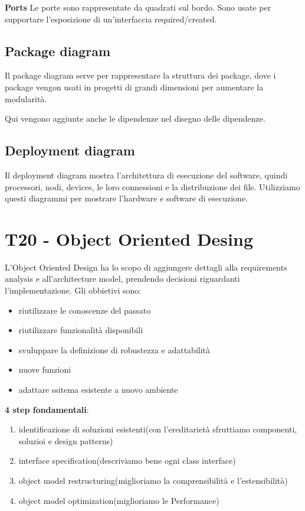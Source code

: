 \documentclass{article}
\begin{document}
\textbf{Ports} Le porte sono rappresentate da quadrati sul bordo. Sono usate per supportare l’esposizione di
un'interfaccia required/created.


\subsection{Package diagram}


Il package diagram serve per rappresentare la struttura dei package, dove i package 
vengon usati in progetti di grandi dimensioni per aumentare la modularità.

Qui vengono aggiunte anche le dipendenze nel disegno delle dipendenze.

\subsection{Deployment diagram}
Il deployment diagram mostra l'architettura di esecuzione del software, quindi processori, nodi, devices,
le loro connessioni e la distribuzione dei file. Utilizziamo questi diagrammi per mostrare l’hardware e
software di esecuzione.

\section{T20 - Object Oriented Desing}
L'Object Oriented Design ha lo scopo di aggiungere dettagli alla requirements analysis e all’architecture
model, prendendo decisioni riguardanti l'implementazione.
Gli obbietivi sono:
\begin{itemize}
    \item riutilizzare le conoscenze del passato
    \item riutilizzare funzionalità disponibili
    \item svuluppare la definizione di robustezza e adattabilità
    \item nuove funzioni
    \item adattare ssitema esistente a nuovo ambiente
\end{itemize}

\textbf{4 step fondamentali}:
\begin{enumerate}
    \item identificazione di soluzioni esistenti(con l'ereditarietà sfruttiamo componenti, soluzioi e design patterns) 
    \item interface specification(descriviamo bene ogni class interface)
    \item object model restructuring(miglioriamo la comprensibilità e l'estensibilità)
    \item object model optimization(miglioriamo le Performance)
\end{enumerate}
\end{document}
